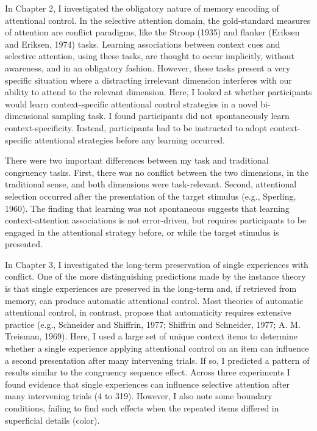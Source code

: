 \documentclass[]{DissertateCUNY}
\begin{document}
In Chapter 2, I investigated the obligatory nature of memory encoding of
attentional control. In the selective attention domain, the
gold-standard measures of attention are conflict paradigms, like the
Stroop (1935) and flanker (Eriksen and Eriksen, 1974) tasks. Learning
associations between context cues and selective attention, using these
tasks, are thought to occur implicitly, without awareness, and in an
obligatory fashion. However, these tasks present a very specific
situation where a distracting irrelevant dimension interferes with our
ability to attend to the relevant dimension. Here, I looked at whether
participants would learn context-specific attentional control strategies
in a novel bi-dimensional sampling task. I found participants did not
spontaneously learn context-specificity. Instead, participants had to be
instructed to adopt context-specific attentional strategies before any
learning occurred.

There were two important differences between my task and traditional
congruency tasks. First, there was no conflict between the two
dimensions, in the traditional sense, and both dimensions were
task-relevant. Second, attentional selection occurred after the
presentation of the target stimulus (e.g., Sperling, 1960). The finding
that learning was not spontaneous suggests that learning
context-attention associations is not error-driven, but requires
participants to be engaged in the attentional strategy before, or while
the target stimulus is presented.

In Chapter 3, I investigated the long-term preservation of single
experiences with conflict. One of the more distinguishing predictions
made by the instance theory is that single experiences are preserved in
the long-term and, if retrieved from memory, can produce automatic
attentional control. Most theories of automatic attentional control, in
contrast, propose that automaticity requires extensive practice (e.g.,
Schneider and Shiffrin, 1977; Shiffrin and Schneider, 1977; A. M.
Treisman, 1969). Here, I used a large set of unique context items to
determine whether a single experience applying attentional control on an
item can influence a second presentation after many intervening trials.
If so, I predicted a pattern of results similar to the congruency
sequence effect. Across three experiments I found evidence that single
experiences can influence selective attention after many intervening
trials (4 to 319). However, I also note some boundary conditions,
failing to find such effects when the repeated items differed in
superficial details (color).
\end{document}
